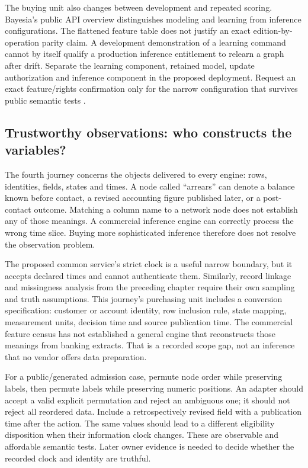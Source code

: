 The buying unit also changes between development and repeated scoring.
Bayesia's public API overview distinguishes modeling and learning from
inference configurations. The flattened feature table does not justify an
exact edition-by-operation parity claim. A development demonstration of a
learning command cannot by itself qualify a production inference entitlement
to relearn a graph after drift. Separate the learning component, retained
model, update authorization and inference component in the proposed deployment.
Request an exact feature/rights confirmation only for the narrow configuration
that survives public semantic tests \citep{exec13_bayesia_api}.

\subsection{Trustworthy observations: who constructs the variables?}

The fourth journey concerns the objects delivered to every engine: rows,
identities, fields, states and times. A node called ``arrears'' can denote a
balance known before contact, a revised accounting figure published later, or
a post-contact outcome. Matching a column name to a network node does not
establish any of those meanings. A commercial inference engine can correctly
process the wrong time slice. Buying more sophisticated inference therefore
does not resolve the observation problem.

The proposed common service's strict clock is a useful narrow boundary, but
it accepts declared times and cannot authenticate them. Similarly, record
linkage and missingness analysis from the preceding chapter require their own
sampling and truth assumptions. This journey's purchasing unit includes a
conversion specification: customer or account identity, row inclusion rule,
state mapping, measurement units, decision time and source publication time.
The commercial feature census has not established a general engine that
reconstructs those meanings from banking extracts. That is a recorded scope
gap, not an inference that no vendor offers data preparation.

For a public/generated admission case, permute node order while preserving
labels, then permute labels while preserving numeric positions. An adapter
should accept a valid explicit permutation and reject an ambiguous one; it
should not reject all reordered data. Include a retrospectively revised field
with a publication time after the action. The same values should lead to a
different eligibility disposition when their information clock changes.
These are observable and affordable semantic tests. Later owner evidence is
needed to decide whether the recorded clock and identity are truthful.

